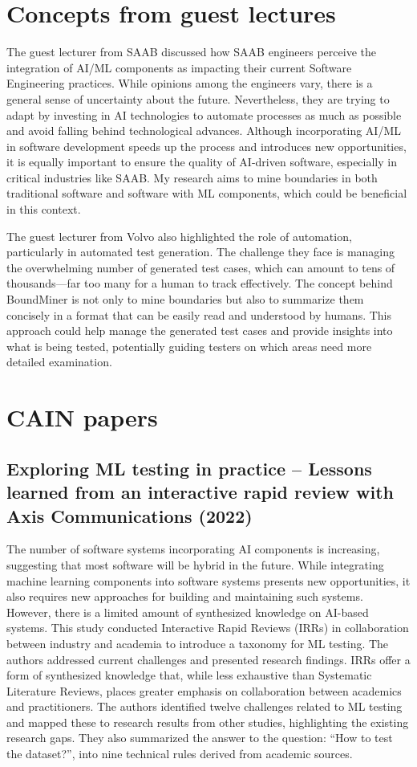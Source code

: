 \documentclass[11pt]{article}
\begin{document}
\section{Concepts from guest lectures}
The guest lecturer from SAAB discussed how SAAB engineers perceive the integration of AI/ML components as impacting their current Software Engineering practices. While opinions among the engineers vary, there is a general sense of uncertainty about the future. Nevertheless, they are trying to adapt by investing in AI technologies to automate processes as much as possible and avoid falling behind technological advances. Although incorporating AI/ML in software development speeds up the process and introduces new opportunities, it is equally important to ensure the quality of AI-driven software, especially in critical industries like SAAB. My research aims to mine boundaries in both traditional software and software with ML components, which could be beneficial in this context.

The guest lecturer from Volvo also highlighted the role of automation, particularly in automated test generation. The challenge they face is managing the overwhelming number of generated test cases, which can amount to tens of thousands—far too many for a human to track effectively. The concept behind BoundMiner is not only to mine boundaries but also to summarize them concisely in a format that can be easily read and understood by humans. This approach could help manage the generated test cases and provide insights into what is being tested, potentially guiding testers on which areas need more detailed examination.


\section{CAIN papers}

\subsection{Exploring ML testing in practice – Lessons learned from an interactive rapid review with Axis Communications (2022)}

The number of software systems incorporating AI components is increasing, suggesting that most software will be hybrid in the future. While integrating machine learning components into software systems presents new opportunities, it also requires new approaches for building and maintaining such systems. However, there is a limited amount of synthesized knowledge on AI-based systems. This study conducted Interactive Rapid Reviews (IRRs) in collaboration between industry and academia to introduce a taxonomy for ML testing. The authors addressed current challenges and presented research findings. IRRs offer a form of synthesized knowledge that, while less exhaustive than Systematic Literature Reviews, places greater emphasis on collaboration between academics and practitioners. The authors identified twelve challenges related to ML testing and mapped these to research results from other studies, highlighting the existing research gaps. They also summarized the answer to the question: “How to test the dataset?”, into nine technical rules derived from academic sources. 
\end{document}
